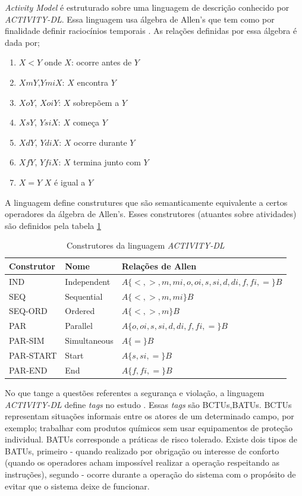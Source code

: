 \documentclass[12pt]{article}
\begin{document}
\textit{Activity Model} é estruturado sobre uma linguagem de descrição conhecido por \textit{ACTIVITY-DL}. Essa linguagem usa álgebra de Allen's que tem como por finalidade definir raciocínios temporais \cite{Allen}. As relações definidas por essa álgebra é dada por; 
\begin{enumerate}
	\item $X < Y$ onde $X$: ocorre antes de $Y$ 
	\item $X m Y$,$Y mi X$: $X$ encontra $Y$
	\item $X o Y$, $X oi Y$: $X$ sobrepõem a $Y$
	\item $X s Y$, $Y si X$: $X$ começa $Y$
	\item $X d Y$, $Y di X$: $X$ ocorre durante $Y$	  
	\item $X f Y$, $Y fi X$: $X$ termina junto com $Y$	  	
	\item $X = Y$ $X$ é igual a $Y$	  		
\end{enumerate}

A linguagem define construtures que são semanticamente equivalente a certos operadores da álgebra de Allen's. Esses construtores (atuantes sobre atividades) são definidos pela tabela \ref{acticonstruct}

\begin{table}[H]
\centering
\begin{tabular}{|l|l|l|}
\hline
Construtor & Nome         & Relações de Allen \\ \hline
IND        & Independent  & $A\{<,>,m,mi,o,oi,s,si,d,di,f,fi,=\}B$\\ \hline
SEQ        & Sequential   & $A\{<,>,m,mi\}B$\\ \hline
SEQ-ORD    & Ordered      & $A\{<,>,m\}B$\\ \hline
PAR        & Parallel     & $A\{o,oi,s,si,d,di,f,fi,=\}B$ \\ \hline
PAR-SIM    & Simultaneous & $A\{=\}B$\\ \hline
PAR-START  & Start        & $A\{s,si,=\}B$\\ \hline
PAR-END    & End          & $A\{f,fi,=\}B$ \\ \hline
\end{tabular}
\caption{Construtores da linguagem \textit{ACTIVITY-DL} \cite{violationcamille}}
\label{acticonstruct}
\end{table}

No que tange a questões referentes a segurança e violação, a linguagem \textit{ACTIVITY-DL} define \textit{tags} no estudo \cite{FADIER2003759}. Essas \textit{tags} são BCTUs,BATUs. BCTUs representam situações informais entre os atores de um determinado campo, por exemplo; trabalhar com produtos químicos sem usar equipamentos de proteção individual. BATUs corresponde a práticas de risco tolerado. Existe dois tipos de BATUs, primeiro - quando realizado por obrigação ou interesse de conforto (quando os operadores acham impossível realizar a operação respeitando as instruções), segundo - ocorre durante a operação do sistema com o propósito de evitar que o sistema deixe de funcionar.    



\end{document}
